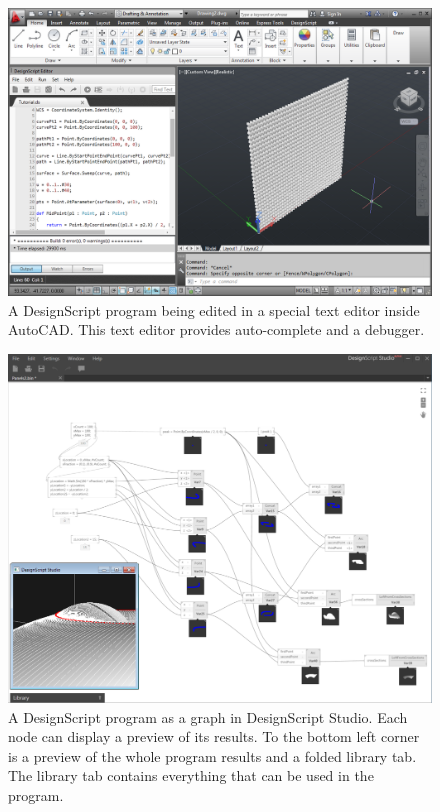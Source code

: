 \documentclass{./llncs2e/llncs}
\begin{document}
	\begin{figure}
	  \centering
	  \includegraphics[width=1.0\textwidth]{img/ds_autocad}
	    \caption{A DesignScript program being edited in a special text editor inside AutoCAD. This text editor provides auto-complete and a debugger.}
	  \label{fig:ds:autocad}
	\end{figure} 

	\begin{figure}
	  \centering
	  \includegraphics[width=1.0\textwidth]{img/ds_dsstudio}
	    \caption{A DesignScript program as a graph in DesignScript Studio. Each node can display a preview of its results. To the bottom left corner is a preview of the whole program results and a folded library tab. The library tab contains everything that can be used in the program.}
	  \label{fig:ds:dsstudio}
	\end{figure} 
\end{document}
